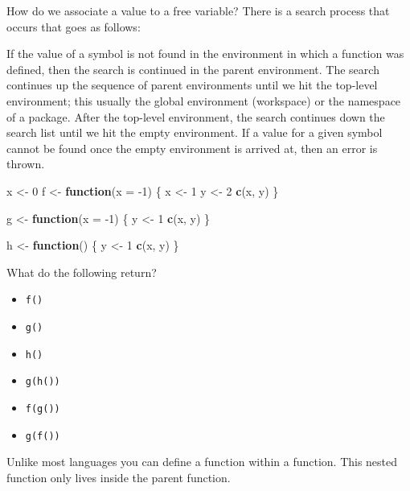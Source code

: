 \documentclass[]{book}
\newenvironment{Shaded}{\begin{snugshade}}{\end{snugshade}}
\newcommand{\ControlFlowTok}[1]{\textcolor[rgb]{0.13,0.29,0.53}{\textbf{#1}}}
\newcommand{\DataTypeTok}[1]{\textcolor[rgb]{0.13,0.29,0.53}{#1}}
\newcommand{\DecValTok}[1]{\textcolor[rgb]{0.00,0.00,0.81}{#1}}
\newcommand{\KeywordTok}[1]{\textcolor[rgb]{0.13,0.29,0.53}{\textbf{#1}}}
\newcommand{\NormalTok}[1]{#1}
\newcommand{\StringTok}[1]{\textcolor[rgb]{0.31,0.60,0.02}{#1}}
\providecommand{\tightlist}{%
  \setlength{\itemsep}{0pt}\setlength{\parskip}{0pt}}
\theoremstyle{definition}
\theoremstyle{definition}
\theoremstyle{definition}
\theoremstyle{remark}
\begin{document}
How do we associate a value to a free variable? There is a search
process that occurs that goes as follows:

If the value of a symbol is not found in the environment in which a
function was defined, then the search is continued in the parent
environment. The search continues up the sequence of parent environments
until we hit the top-level environment; this usually the global
environment (workspace) or the namespace of a package. After the
top-level environment, the search continues down the search list until
we hit the empty environment. If a value for a given symbol cannot be
found once the empty environment is arrived at, then an error is thrown.

\begin{Shaded}
\begin{Highlighting}[]
\NormalTok{x <-}\StringTok{ }\DecValTok{0}
\NormalTok{f <-}\StringTok{ }\ControlFlowTok{function}\NormalTok{(}\DataTypeTok{x =} \DecValTok{-1}\NormalTok{) \{}
\NormalTok{  x <-}\StringTok{ }\DecValTok{1}
\NormalTok{  y <-}\StringTok{ }\DecValTok{2}
  \KeywordTok{c}\NormalTok{(x, y)}
\NormalTok{\}}

\NormalTok{g <-}\StringTok{ }\ControlFlowTok{function}\NormalTok{(}\DataTypeTok{x =} \DecValTok{-1}\NormalTok{) \{}
\NormalTok{  y <-}\StringTok{ }\DecValTok{1}
  \KeywordTok{c}\NormalTok{(x, y)}
\NormalTok{\}}

\NormalTok{h <-}\StringTok{ }\ControlFlowTok{function}\NormalTok{() \{}
\NormalTok{  y <-}\StringTok{ }\DecValTok{1}
  \KeywordTok{c}\NormalTok{(x, y)}
\NormalTok{\}}
\end{Highlighting}
\end{Shaded}

What do the following return?

\begin{itemize}
\tightlist
\item
  \texttt{f()}
\item
  \texttt{g()}
\item
  \texttt{h()}
\item
  \texttt{g(h())}
\item
  \texttt{f(g())}
\item
  \texttt{g(f())}
\end{itemize}

Unlike most languages you can define a function within a function. This
nested function only lives inside the parent function.
\end{document}
